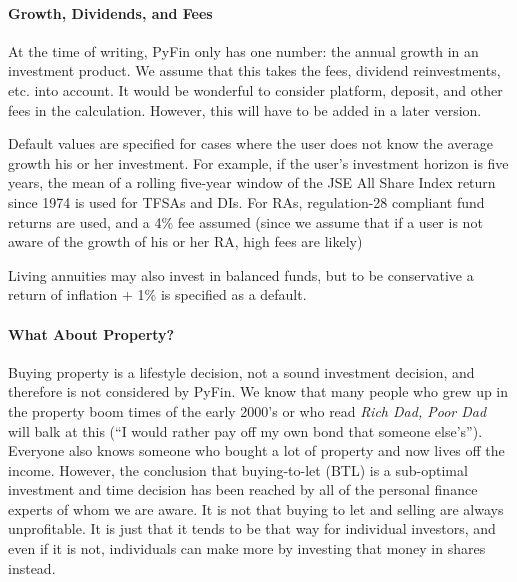 \documentclass[a4paper, justified]{tufte-handout}
\begin{document}
\paragraph{Growth, Dividends, and Fees}
At the time of writing, PyFin only has one number: the annual growth in an investment product. We assume that this takes the fees, dividend reinvestments, etc. into account. It would be wonderful to consider platform, deposit, and other fees in the calculation. However, this will have to be added in a later version. 

Default values are specified for cases where the user does not know the average growth his or her investment. For example, if the user's investment horizon is five years, the mean of a rolling five-year window of the JSE All Share Index return since 1974 is used for TFSAs and DIs. For RAs, regulation-28 compliant fund returns are used, and a 4\% fee assumed (since we assume that if a user is not aware of the growth of his or her RA, high fees are likely)

Living annuities may also invest in balanced funds, but to be conservative a return of inflation + 1\% is specified as a default.

\paragraph{What About Property?}
Buying property is a lifestyle decision, not a sound investment decision, and therefore is not considered by PyFin. We know that many people who grew up in the property boom times of the early 2000's or who read \textit{Rich Dad, Poor Dad} will balk at this (``I would rather pay off my own bond that someone else's''). Everyone also knows someone who bought a lot of property and now lives off the income. However, the conclusion that buying-to-let (BTL) is a sub-optimal investment and time decision has been reached by all of the personal finance experts of whom we are aware. It is not that buying to let and selling are always unprofitable. It is just that it tends to be that way for individual investors, and even if it is not, individuals can make more by investing that money in shares instead. 
\end{document}

